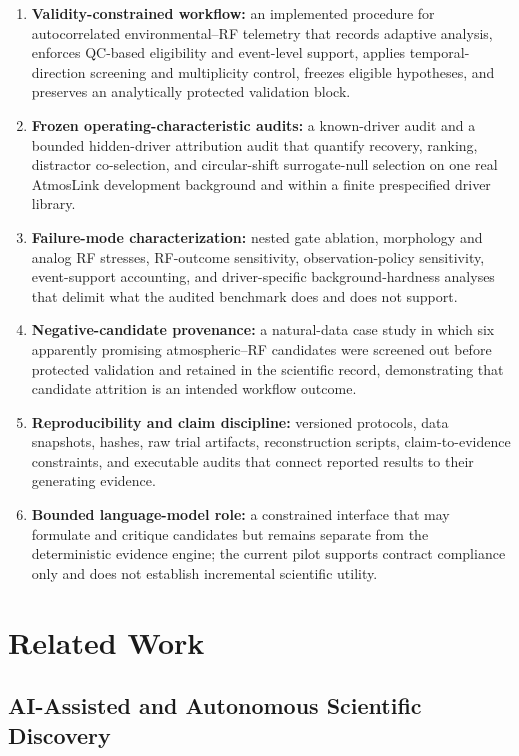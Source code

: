 \documentclass{ieeeaccess}
\providecommand{\tightlist}{\setlength{\itemsep}{0pt}\setlength{\parskip}{0pt}}
\begin{document}
\begin{enumerate}
\def\labelenumi{\arabic{enumi}.}
\tightlist
\item
  \textbf{Validity-constrained workflow:} an implemented procedure for autocorrelated environmental--RF telemetry that records adaptive analysis, enforces QC-based eligibility and event-level support, applies temporal-direction screening and multiplicity control, freezes eligible hypotheses, and preserves an analytically protected validation block.
\item
  \textbf{Frozen operating-characteristic audits:} a known-driver audit and a bounded hidden-driver attribution audit that quantify recovery, ranking, distractor co-selection, and circular-shift surrogate-null selection on one real AtmosLink development background and within a finite prespecified driver library.
\item
  \textbf{Failure-mode characterization:} nested gate ablation, morphology and analog RF stresses, RF-outcome sensitivity, observation-policy sensitivity, event-support accounting, and driver-specific background-hardness analyses that delimit what the audited benchmark does and does not support.
\item
  \textbf{Negative-candidate provenance:} a natural-data case study in which six apparently promising atmospheric--RF candidates were screened out before protected validation and retained in the scientific record, demonstrating that candidate attrition is an intended workflow outcome.
\item
  \textbf{Reproducibility and claim discipline:} versioned protocols, data snapshots, hashes, raw trial artifacts, reconstruction scripts, claim-to-evidence constraints, and executable audits that connect reported results to their generating evidence.
\item
  \textbf{Bounded language-model role:} a constrained interface that may formulate and critique candidates but remains separate from the deterministic evidence engine; the current pilot supports contract compliance only and does not establish incremental scientific utility.
\end{enumerate}

\section{Related Work}\label{related-work}

\subsection{AI-Assisted and Autonomous Scientific Discovery}\label{ai-assisted-and-autonomous-scientific-discovery}
\end{document}
